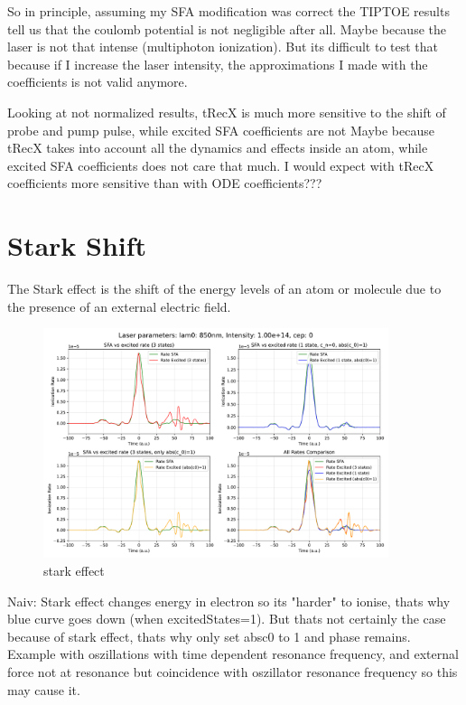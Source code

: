 So in principle, assuming my SFA modification was correct the TIPTOE results tell us that the coulomb potential is not negligible after all. 
Maybe because the laser is not that intense (multiphoton ionization).
But its difficult to test that because if I increase the laser intensity, the approximations I made with the coefficients is not valid anymore.

Looking at not normalized results, tRecX is much more sensitive to the shift of probe and pump pulse, while excited SFA coefficients are not
Maybe because tRecX takes into account all the dynamics and effects inside an atom, while excited SFA coefficients does not care that much.
I would expect with tRecX coefficients more sensitive than with ODE coefficients???

\section{Stark Shift}
The Stark effect is the shift of the energy levels of an atom or molecule due to the presence of an external electric field.

\begin{figure}[H]
    \centering
    \includegraphics[width=0.9\textwidth]{figures/rate4_850_1.00e+14_onlystark.pdf}
    \caption{stark effect}
    \label{fig:starkeffect}
\end{figure}

Naiv: Stark effect changes energy in electron so its "harder" to ionise, thats why blue curve goes down (when excitedStates=1). 
But thats not certainly the case because of stark effect, thats why only set absc0 to 1 and phase remains. 
Example with oszillations with time dependent resonance frequency, and external force not at resonance but coincidence with oszillator resonance frequency so this may cause it.


